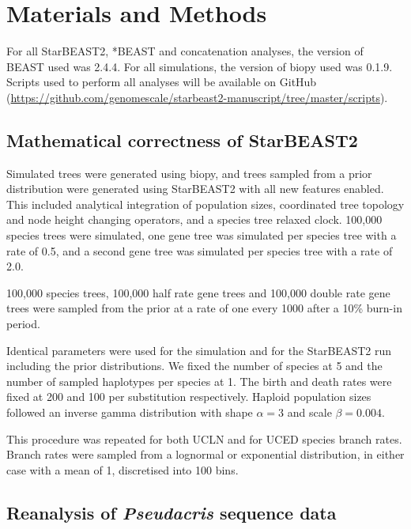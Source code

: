 \documentclass[nogrid]{MBE}%
\begin{document}
\section{Materials and Methods}

For all StarBEAST2, *BEAST and concatenation analyses, the version of BEAST
used was 2.4.4. For all simulations, the version of biopy \citep{biopy} used
was 0.1.9. Scripts used to perform all analyses will be available on
GitHub (\url{https://github.com/genomescale/starbeast2-manuscript/tree/master/scripts}).

\subsection{Mathematical correctness of StarBEAST2}

Simulated trees were generated using biopy, and trees sampled from a prior
distribution were generated using StarBEAST2 with all new features enabled.
This included analytical integration of population sizes, coordinated tree
topology and node height changing operators, and a species tree relaxed clock.
100,000 species trees were simulated, one gene tree was simulated per species
tree with a rate of 0.5, and a second gene tree was simulated per species tree
with a rate of 2.0.

100,000 species trees, 100,000 half rate gene trees and 100,000 double rate
gene trees were sampled from the prior at a rate of one every 1000 after a
10\% burn-in period.

Identical parameters were used for the simulation and for the StarBEAST2 run
including the prior distributions. We fixed the number of species at 5 and the
number of sampled haplotypes per species at 1. The birth and death rates were fixed at
200 and 100 per substitution respectively. Haploid population sizes followed
an inverse gamma distribution with shape $\alpha = 3$ and scale $\beta =
0.004$.

This procedure was repeated for both UCLN and for UCED species branch rates.
Branch rates were sampled from a lognormal or exponential distribution, in
either case with a mean of 1, discretised into 100 bins.

\subsection{Reanalysis of \textit{Pseudacris} sequence data}
\end{document}
